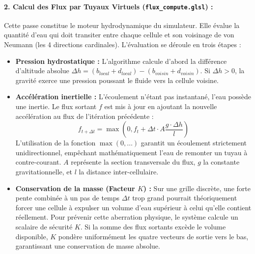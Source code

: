 \documentclass[10pt,twocolumn,a4paper]{article}
\begin{document}
\paragraph{2. Calcul des Flux par Tuyaux Virtuels (\texttt{flux\_compute.glsl}) :}
Cette passe constitue le moteur hydrodynamique du simulateur. Elle évalue la quantité d'eau qui doit transiter entre chaque cellule et son voisinage de von Neumann (les 4 directions cardinales). L'évaluation se déroule en trois étapes :
\begin{itemize}
    \item \textbf{Pression hydrostatique :} L'algorithme calcule d'abord la différence d'altitude absolue $\Delta h = (b_{local} + d_{local}) - (b_{voisin} + d_{voisin})$. Si $\Delta h > 0$, la gravité exerce une pression poussant le fluide vers la cellule voisine.
    \item \textbf{Accélération inertielle :} L'écoulement n'étant pas instantané, l'eau possède une inertie. Le flux sortant $f$ est mis à jour en ajoutant la nouvelle accélération au flux de l'itération précédente :
          $$f_{t+\Delta t} = \max \left( 0, f_t + \Delta t \cdot A \frac{g \cdot \Delta h}{l} \right)$$
          L'utilisation de la fonction $\max(0, \dots)$ garantit un écoulement strictement unidirectionnel, empêchant mathématiquement l'eau de remonter un tuyau à contre-courant. $A$ représente la section transversale du flux, $g$ la constante gravitationnelle, et $l$ la distance inter-cellulaire.
    \item \textbf{Conservation de la masse (Facteur $K$) :} Sur une grille discrète, une forte pente combinée à un pas de temps $\Delta t$ trop grand pourrait théoriquement forcer une cellule à expulser un volume d'eau supérieur à celui qu'elle contient réellement. Pour prévenir cette aberration physique, le système calcule un scalaire de sécurité $K$. Si la somme des flux sortants excède le volume disponible, $K$ pondère uniformément les quatre vecteurs de sortie vers le bas, garantissant une conservation de masse absolue.
\end{itemize}
\end{document}
